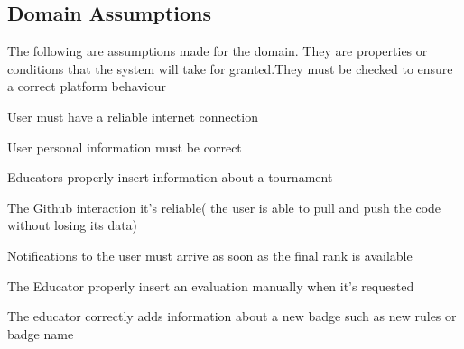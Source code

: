 \subsection{Domain Assumptions}
The following are assumptions made for the domain. They are properties or conditions that the system will take for granted.They must be checked to ensure a correct platform behaviour
\begin{enumerate}[label={[D\arabic*]}]

    \item User must have a reliable internet connection
    \item User personal information must be correct
    \item Educators properly insert information about a tournament
    \item The Github interaction it's reliable( the user is able to pull and push the code without losing its data)
    \item Notifications to the user must arrive as soon as the final rank is available
    \item The Educator properly insert an evaluation manually when it's requested
    \item The educator correctly adds information about a new badge such as new rules or badge name
    
\end{enumerate}